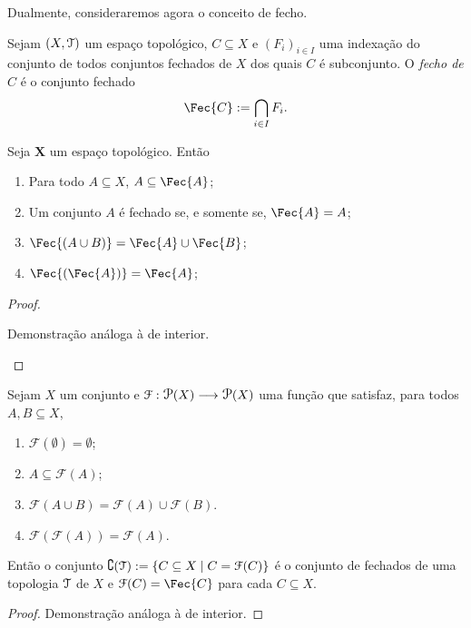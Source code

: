 	Dualmente, consideraremos agora o conceito de fecho.

\begin{defi}
	Sejam $(X,\mathcal{T})$ um espaço topológico, $C \subseteq X$ e $(F_i)_{i \in I}$ uma indexação do conjunto de todos conjuntos fechados de $X$ dos quais $C$ é subconjunto. O \emph{fecho de $C$} é o conjunto fechado
	\begin{equation*}
	\Fec{C} := \bigcap_{i \in I} F_i.
	\end{equation*}
\end{defi}

\begin{prop}
	Seja $\bm X$ um espaço topológico. Então
	\begin{enumerate}	
	\item Para todo $A \subseteq X$, $A \subseteq \Fec{A}$;
	\item Um conjunto $A$ é fechado se, e somente se, $\Fec{A}=A$;
	\item $\Fec{(A \cup B)} = \Fec{A} \cup \Fec{B}$;
	\item $\Fec{(\Fec{A})} = \Fec{A}$;
	\end{enumerate}
\end{prop}
\begin{proof}
	\begin{enumerate}
	Demonstração análoga à de interior.
	\end{enumerate}
\end{proof}

\begin{prop}
	Sejam $X$ um conjunto e $\mathcal F: \p(X) \to \p(X)$ uma função que satisfaz, para todos $A,B \subseteq X$,
	\begin{enumerate}
	\item $\mathcal F(\emptyset) = \emptyset$;
	\item $A \subseteq \mathcal F(A)$;
	\item $\mathcal F(A \cup B) = \mathcal F(A) \cup \mathcal F(B)$.
	\item $\mathcal F(\mathcal F(A)) = \mathcal F(A)$.
	\end{enumerate}
	
Então o conjunto $\complement(\mathcal{T}) := \left\{C \subseteq X \;\middle\vert\; C = \mathcal F(C) \right\}$ é o conjunto de fechados de uma topologia $\mathcal{T}$ de $X$ e $\mathcal F(C) = \Fec{C}$ para cada $C \subseteq X$.
\end{prop}
\begin{proof}
	Demonstração análoga à de interior.
\end{proof}


